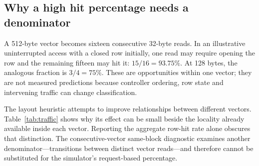 \subsection{Why a high hit percentage needs a denominator}
A 512-byte vector becomes sixteen consecutive 32-byte reads. In an illustrative uninterrupted access with a closed row initially, one read may require opening the row and the remaining fifteen may hit it: $15/16=93.75\%$. At 128 bytes, the analogous fraction is $3/4=75\%$. These are opportunities within one vector; they are not measured predictions because controller ordering, row state and intervening traffic can change classification.

\begin{table}[htbp]\centering\small
\caption[Within-vector and adjacency traffic]{Traffic composition averaged over the ten primary splits. The last two percentages use all emitted transactions as denominator. A within-vector follow-up is any transaction after the first transaction of that logical vector read. It is not automatically a row hit.}\label{tab:traffic}

\end{table}

The layout heuristic attempts to improve relationships between different vectors. Table~\ref{tab:traffic} shows why its effect can be small beside the locality already available inside each vector. Reporting the aggregate row-hit rate alone obscures that distinction. The consecutive-vector same-block diagnostic examines another denominator---transitions between distinct vector reads---and therefore cannot be substituted for the simulator's request-based percentage.
